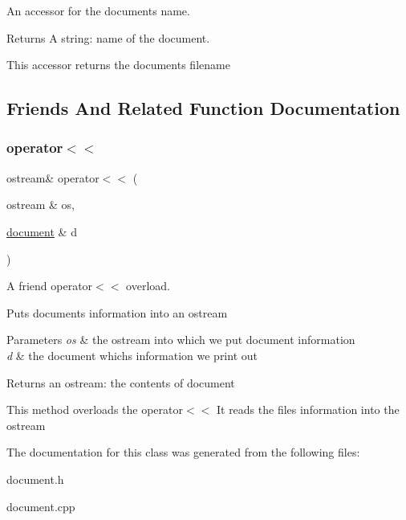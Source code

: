 An accessor for the document\textquotesingle{}s name. 

\begin{DoxyReturn}{Returns}
A string\+: name of the document.
\end{DoxyReturn}
This accessor returns the document\textquotesingle{}s filename 

\subsection{Friends And Related Function Documentation}
\mbox{\label{classdocument_aafdf2f4ecb817252c0e22f7c072ec5b0}} 
\subsubsection{\texorpdfstring{operator$<$$<$}{operator<<}}
{\footnotesize\ttfamily ostream\& operator$<$$<$ (\begin{DoxyParamCaption}\item[{ostream \&}]{os,  }\item[{\hyperlink{classdocument}{document} \&}]{d }\end{DoxyParamCaption})\hspace{0.3cm}{\ttfamily [friend]}}



A friend operator$<$$<$ overload. 

Puts document\textquotesingle{}s information into an ostream 
\begin{DoxyParams}{Parameters}
{\em os} & the ostream into which we put document information \\
\hline
{\em d} & the document which\textquotesingle{}s information we print out \\
\hline
\end{DoxyParams}
\begin{DoxyReturn}{Returns}
an ostream\+: the contents of document
\end{DoxyReturn}
This method overloads the operator$<$$<$ It reads the file\textquotesingle{}s information into the ostream 

The documentation for this class was generated from the following files\+:\begin{DoxyCompactItemize}
\item 
document.\+h\item 
document.\+cpp\end{DoxyCompactItemize}
